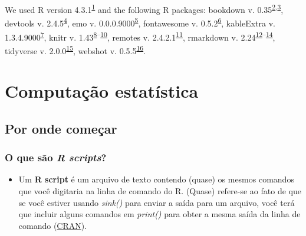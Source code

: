 \documentclass[
]{book}
\providecommand{\tightlist}{%
  \setlength{\itemsep}{0pt}\setlength{\parskip}{0pt}}
\begin{document}
We used R version 4.3.1\textsuperscript{\protect\hyperlink{ref-base}{1}} and the following R packages: bookdown v. 0.35\textsuperscript{\protect\hyperlink{ref-bookdown2016}{2},\protect\hyperlink{ref-bookdown2023}{3}}, devtools v. 2.4.5\textsuperscript{\protect\hyperlink{ref-devtools}{4}}, emo v. 0.0.0.9000\textsuperscript{\protect\hyperlink{ref-emo}{5}}, fontawesome v. 0.5.2\textsuperscript{\protect\hyperlink{ref-fontawesome}{6}}, kableExtra v. 1.3.4.9000\textsuperscript{\protect\hyperlink{ref-kableExtra}{7}}, knitr v. 1.43\textsuperscript{\protect\hyperlink{ref-knitr2014}{8}--\protect\hyperlink{ref-knitr2023}{10}}, remotes v. 2.4.2.1\textsuperscript{\protect\hyperlink{ref-remotes}{11}}, rmarkdown v. 2.24\textsuperscript{\protect\hyperlink{ref-rmarkdown2018}{12}--\protect\hyperlink{ref-rmarkdown2023}{14}}, tidyverse v. 2.0.0\textsuperscript{\protect\hyperlink{ref-tidyverse}{15}}, webshot v. 0.5.5\textsuperscript{\protect\hyperlink{ref-webshot}{16}}.

\hypertarget{computacao-estatistica}{%
\chapter{\texorpdfstring{\textbf{Computação estatística}}{Computação estatística}}\label{computacao-estatistica}}

\hypertarget{inicio}{%
\section{Por onde começar}\label{inicio}}

\hypertarget{o-que-suxe3o-r-scripts}{%
\subsection{\texorpdfstring{O que são \emph{R scripts}?}{O que são R scripts?}}\label{o-que-suxe3o-r-scripts}}

\begin{itemize}
\tightlist
\item
  Um \textbf{R script} é um arquivo de texto contendo (quase) os mesmos comandos que você digitaria na linha de comando do R. (Quase) refere-se ao fato de que se você estiver usando \emph{sink()} para enviar a saída para um arquivo, você terá que incluir alguns comandos em \emph{print()} para obter a mesma saída da linha de comando (\href{https://cran.r-project.org/doc/contrib/Lemon-kickstart/kr_scrpt.html}{CRAN}).
\end{itemize}
\end{document}
